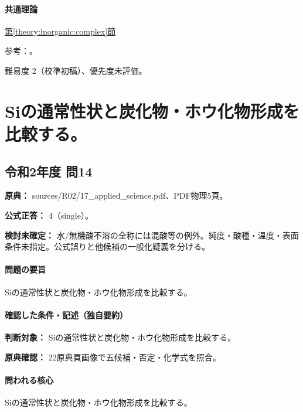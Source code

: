 \paragraph{共通理論} \hyperref[theory:inorganic:complex]{第\ref*{theory:inorganic:complex}節}

\par 参考：\cite{qualitative_stanford,inorganic_zinc_ref}。

\par 難易度 2（校準初稿）、優先度未評価。

\section{Siの通常性状と炭化物・ホウ化物形成を比較する。}

\subsection{令和2年度 問14}
\label{q:r02-reg-applied-14}

\noindent\textbf{原典：} sources/R02/17\_applied\_science.pdf、PDF物理5頁。

\textbf{公式正答：} 4（single）。

\par\textbf{検討未確定：} 水/無機酸不溶の全称には混酸等の例外。純度・酸種・温度・表面条件未指定。公式誤りと他候補の一般化疑義を分ける。

\paragraph{問題の要旨} Siの通常性状と炭化物・ホウ化物形成を比較する。

\paragraph{確認した条件・記述（独自要約）}\mbox{}\par

\noindent\textbf{判断対象：} Siの通常性状と炭化物・ホウ化物形成を比較する。\par

\noindent\textbf{原典確認：} 22原典頁画像で五候補・否定・化学式を照合。\par

\paragraph{問われる核心} Siの通常性状と炭化物・ホウ化物形成を比較する。

